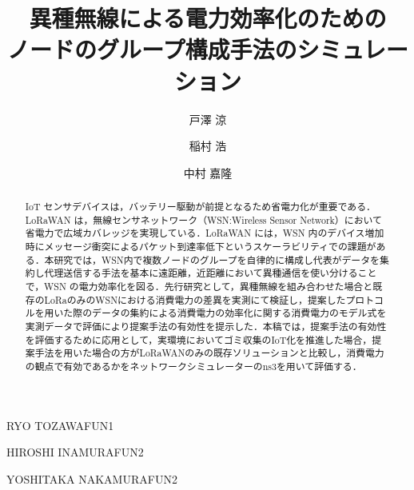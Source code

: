 \documentclass[Japanese]{dicomopapers}
\begin{document}
\title{異種無線による電力効率化のための\\ノードのグループ構成手法のシミュレーション}
\author{戸澤 涼}{RYO TOZAWA}{FUN1}
\author{稲村 浩}{HIROSHI INAMURA}{FUN2}
\author{中村 嘉隆}{YOSHITAKA NAKAMURA}{FUN2}
\begin{abstract}
IoT センサデバイスは，バッテリー駆動が前提となるため省電力化が重要である．LoRaWAN は，無線センサネットワーク（WSN:Wireless Sensor Network）において省電力で広域カバレッジを実現している．LoRaWAN には，WSN 内のデバイス増加時にメッセージ衝突によるパケット到達率低下というスケーラビリティでの課題がある．本研究では，WSN内で複数ノードのグループを自律的に構成し代表がデータを集約し代理送信する手法を基本に遠距離，近距離において異種通信を使い分けることで，WSN の電力効率化を図る．先行研究として，異種無線を組み合わせた場合と既存のLoRaのみのWSNにおける消費電力の差異を実測にて検証し，提案したプロトコルを用いた際のデータの集約による消費電力の効率化に関する消費電力のモデル式を実測データで評価により提案手法の有効性を提示した．本稿では，提案手法の有効性を評価するために応用として，実環境においてゴミ収集のIoT化を推進した場合，提案手法を用いた場合の方がLoRaWANのみの既存ソリューションと比較し，消費電力の観点で有効であるかをネットワークシミュレーターのns3を用いて評価する．
\end{abstract}

\maketitle

\end{document}
